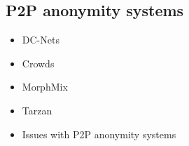 \documentclass[../overview.tex]{subfiles}
\begin{document}
\subsection{P2P anonymity systems}
\begin{itemize}
	\item DC-Nets
	\item Crowds
	\item MorphMix
	\item Tarzan
	\item Issues with P2P anonymity systems
\end{itemize}
\end{document}
